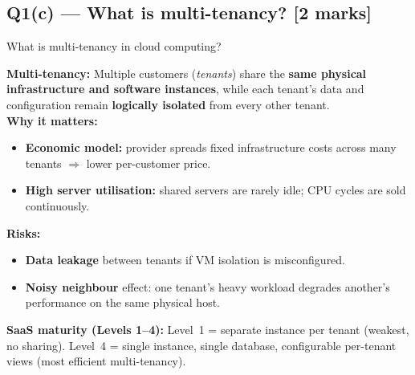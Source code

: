 \documentclass[12pt, a4paper]{article}
\newenvironment{qbox}{\begin{mdframed}[style=qframe]}{\end{mdframed}}
\newenvironment{solbox}{\begin{mdframed}[style=solframe]}{\end{mdframed}}
\newcommand{\qmarks}[1]{\hfill\textbf{\color{orange!70!black}[#1 marks]}}
\begin{document}
\subsection{Q1(c) --- What is multi-tenancy? \texorpdfstring{\qmarks{2}}{}}
\begin{qbox}What is multi-tenancy in cloud computing?\end{qbox}
\begin{solbox}
\textbf{Multi-tenancy:} Multiple customers (\emph{tenants}) share the \textbf{same physical
infrastructure and software instances}, while each tenant's data and configuration remain
\textbf{logically isolated} from every other tenant.\\[4pt]

\textbf{Why it matters:}
\begin{itemize}[leftmargin=1.4cm, itemsep=2pt]
  \item \textbf{Economic model:} provider spreads fixed infrastructure costs across many
    tenants $\Rightarrow$ lower per-customer price.
  \item \textbf{High server utilisation:} shared servers are rarely idle; CPU cycles are sold
    continuously.
\end{itemize}

\textbf{Risks:}
\begin{itemize}[leftmargin=1.4cm, itemsep=1pt]
  \item \textbf{Data leakage} between tenants if VM isolation is misconfigured.
  \item \textbf{Noisy neighbour} effect: one tenant's heavy workload degrades another's
    performance on the same physical host.
\end{itemize}

\textbf{SaaS maturity (Levels 1--4):} Level~1 = separate instance per tenant (weakest, no
sharing). Level~4 = single instance, single database, configurable per-tenant views (most
efficient multi-tenancy).
\end{solbox}

\end{document}
